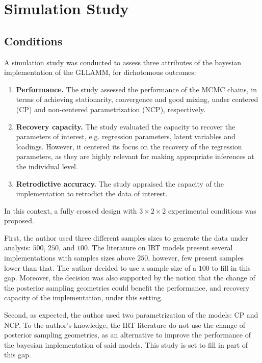 \chapter{Simulation Study} \label{chap:simulation}

\section{Conditions}

A simulation study was conducted to assess three attributes of the bayesian implementation of the GLLAMM, for dichotomous outcomes:
%
\begin{enumerate}
	\item \textbf{Performance.} The study assessed the performance of the MCMC chains, in terms of achieving stationarity, convergence and good mixing,  under centered (CP) and non-centered parametrization (NCP), respectively.
	\item \textbf{Recovery capacity.} The study evaluated the capacity to recover the parameters of interest, e.g. regression parameters, latent variables and loadings. However, it centered its focus on the recovery of the regression parameters, as they are highly relevant for making appropriate inferences at the individual level.
	\item \textbf{Retrodictive accuracy.} The study appraised the capacity of the implementation to retrodict the data of interest.
\end{enumerate} 

\noindent In this context, a fully crossed design with $3 \times 2 \times 2$ experimental conditions was proposed. 

First, the author used three different samples sizes to generate the data under analysis: $500$, $250$, and $100$. The literature on IRT models present several implementations with samples sizes above $250$, however, few present samples lower than that. The author decided to use a sample size of a $100$ to fill in this gap. Moreover, the decision was also supported by the notion that the change of the posterior sampling geometries could benefit the performance, and recovery capacity of the implementation, under this setting.

Second, as expected, the author used two parametrization of the models: CP and NCP. To the author's knowledge, the IRT literature do not use the change of posterior sampling geometries, as an alternative to improve the performance of the bayesian implementation of said models. This study is set to fill in part of this gap.

